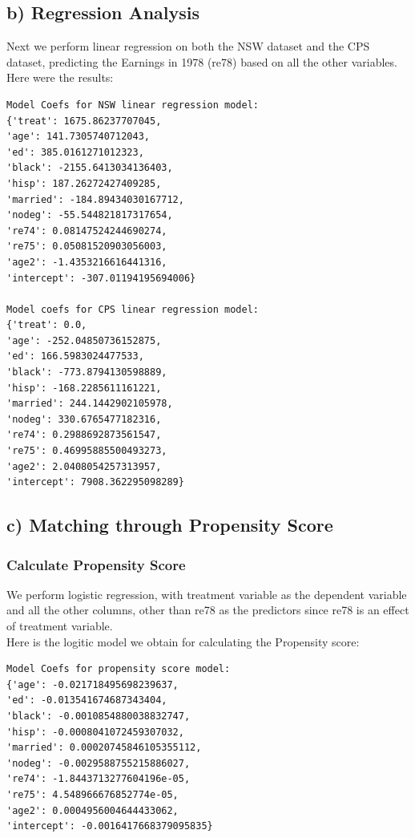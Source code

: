 \documentclass{article}
\begin{document}
\subsection{b) Regression Analysis}
Next we perform linear regression on both the NSW dataset and
the CPS dataset, predicting the Earnings in 1978 (re78) based on
all the other variables.\\
Here were the results:\\
\begin{verbatim}
Model Coefs for NSW linear regression model:
{'treat': 1675.86237707045, 
'age': 141.7305740712043, 
'ed': 385.0161271012323, 
'black': -2155.6413034136403, 
'hisp': 187.26272427409285, 
'married': -184.89434030167712, 
'nodeg': -55.544821817317654, 
're74': 0.08147524244690274, 
're75': 0.05081520903056003, 
'age2': -1.4353216616441316, 
'intercept': -307.01194195694006}

Model coefs for CPS linear regression model:
{'treat': 0.0, 
'age': -252.04850736152875, 
'ed': 166.5983024477533, 
'black': -773.8794130598889, 
'hisp': -168.2285611161221, 
'married': 244.1442902105978, 
'nodeg': 330.6765477182316, 
're74': 0.2988692873561547, 
're75': 0.46995885500493273, 
'age2': 2.0408054257313957, 
'intercept': 7908.362295098289}

\end{verbatim}

\subsection{c) Matching through Propensity Score}
\subsubsection{Calculate Propensity Score}
We perform logistic regression, with treatment variable as the
dependent variable and all the other columns, other than re78 as the predictors
since re78 is an effect of treatment variable.\\
Here is the logitic model we obtain for calculating the Propensity
score:\\
\begin{verbatim}
Model Coefs for propensity score model:
{'age': -0.021718495698239637, 
'ed': -0.013541674687343404, 
'black': -0.0010854880038832747, 
'hisp': -0.0008041072459307032, 
'married': 0.00020745846105355112, 
'nodeg': -0.0029588755215886027, 
're74': -1.8443713277604196e-05, 
're75': 4.548966676852774e-05, 
'age2': 0.0004956004644433062, 
'intercept': -0.0016417668379095835}
\end{verbatim}
\clearpage
\end{document}
